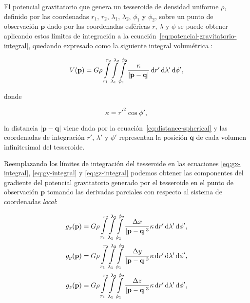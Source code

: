 El potencial gravitatorio que genera un tesseroide de densidad uniforme $\rho$,
definido por las coordenadas $r_1$, $r_2$, $\lambda_1$, $\lambda_2$, $\phi_1$
y $\phi_2$, sobre un punto de observación $\mathbf{p}$ dado por las coordenadas
esféricas $r$, $\lambda$ y $\phi$ se puede obtener aplicando estos límites de
integración a la ecuación~\ref{eq:potencial-gravitatorio-integral}, quedando
expresado como la siguiente integral volumétrica
\citep{grombein2013,uieda2016}:

\begin{equation}
    V(\mathbf{p}) = G \rho
        \int\limits_{r_1}^{r_2}
        \int\limits_{\lambda_1}^{\lambda_2}
        \int\limits_{\phi_1}^{\phi_2}
        \frac{\kappa}{|\mathbf{p} - \mathbf{q}|}
        \mathop{}\!\textnormal{d} r' \mathop{}\!\textnormal{d} \lambda' \mathop{}\!\textnormal{d} \phi',
    \label{eq:potencial-tesseroide}
\end{equation}

\noindent donde

\begin{equation}
    \kappa = {r'}^2 \cos \phi',
    \label{eq:kappa}
\end{equation}

\noindent la distancia $|\mathbf{p} - \mathbf{q}|$ viene dada por la
ecuación~\ref{eq:distance-spherical} y las coordenadas de integración $r'$,
$\lambda'$ y $\phi'$ representan la posición $\mathbf{q}$ de cada volumen
infinitesimal del tesseroide.

Reemplazando los límites de integración del tesseroide en las ecuaciones
\ref{eq:gx-integral}, \ref{eq:gy-integral} y \ref{eq:gz-integral} podemos
obtener las componentes del gradiente del potencial gravitatorio generado por
el tesseroide en el punto de observación $\mathbf{p}$ tomando las derivadas
parciales con respecto al sistema de coordenadas \emph{local}:


\begin{align}
    g_x(\mathbf{p}) &=
        G \rho
        \int\limits_{r_1}^{r_2}
        \int\limits_{\lambda_1}^{\lambda_2}
        \int\limits_{\phi_1}^{\phi_2}
        \frac{\Delta x}{|\mathbf{p} - \mathbf{q}|^3}
        \kappa
        \diff r' \diff \lambda' \diff \phi',
    \label{eq:gx-tesseroide}
    \\
    g_y(\mathbf{p}) &=
        G \rho
        \int\limits_{r_1}^{r_2}
        \int\limits_{\lambda_1}^{\lambda_2}
        \int\limits_{\phi_1}^{\phi_2}
        \frac{\Delta y}{|\mathbf{p} - \mathbf{q}|^3}
        \kappa
        \diff r' \diff \lambda' \diff \phi',
    \label{eq:gy-tesseroide}
    \\
    g_z(\mathbf{p}) &=
        G \rho
        \int\limits_{r_1}^{r_2}
        \int\limits_{\lambda_1}^{\lambda_2}
        \int\limits_{\phi_1}^{\phi_2}
        \frac{\Delta z}{|\mathbf{p} - \mathbf{q}|^3}
        \kappa
        \diff r' \diff \lambda' \diff \phi',
    \label{eq:gz-tesseroide}
\end{align}

